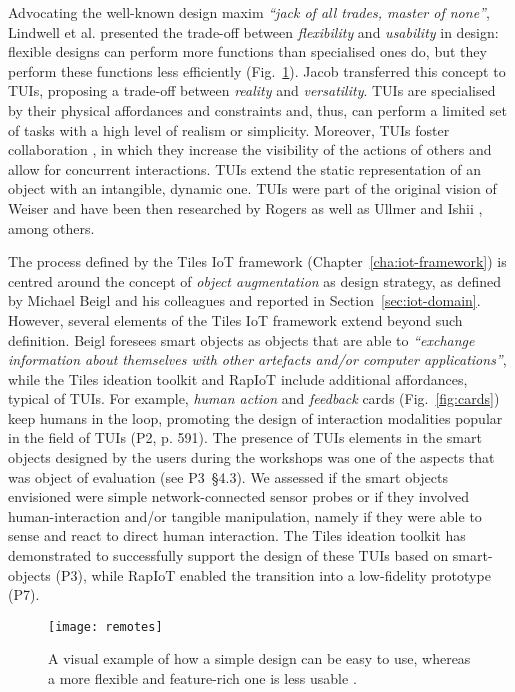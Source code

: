 Advocating the well-known design maxim \textit{\enquote{jack of all trades, master of none}}, Lindwell et al. \autocite*[p. 102]{lidwell_universal_2010} presented the trade-off between \textit{flexibility} and \textit{usability} in design: flexible designs can perform more functions than specialised ones do, but they perform these functions less efficiently (Fig.~\ref{fig:remotes}). Jacob \autocite*{jacob_reality-based_2008} transferred this concept to TUIs, proposing a trade-off between \textit{reality} and \textit{versatility}. TUIs are specialised by their physical affordances and constraints and, thus, can perform a limited set of tasks with a high level of realism or simplicity. Moreover, TUIs foster collaboration \autocite{rogers_configuring_2003}, in which they increase the visibility of the actions of others and allow for concurrent interactions. TUIs extend the static representation of an object with an intangible, dynamic one. TUIs were part of the original vision of Weiser and have been then researched by Rogers as well as Ullmer and Ishii \autocite*{ullmer_emerging_2000}, among others.

The process defined by the Tiles IoT framework (Chapter~\ref{cha:iot-framework}) is centred around the concept of \textit{object augmentation} as design strategy, as defined by Michael Beigl and his colleagues \autocite*{beigl_mediacups_2001} and reported in Section~\ref{sec:iot-domain}. However, several elements of the Tiles IoT framework extend beyond such definition. Beigl foresees smart objects as objects that are able to \textit{\enquote{exchange information about themselves with other artefacts and/or computer applications}}, while the Tiles ideation toolkit and RapIoT include additional affordances, typical of TUIs. For example, \textit{human action} and \textit{feedback} cards (Fig.~\ref{fig:cards}) keep humans in the loop, promoting the design of interaction modalities popular in the field of TUIs (P2, p. 591). The presence of TUIs elements in the smart objects designed by the users during the workshops was one of the aspects that was object of evaluation (see P3~\S4.3). We assessed if the smart objects envisioned were simple network-connected sensor probes or if they involved human-interaction and/or tangible manipulation, namely if they were able to sense and react to direct human interaction. The Tiles ideation toolkit has demonstrated to successfully support the design of these TUIs based on smart-objects (P3), while RapIoT enabled the transition into a low-fidelity prototype (P7).

\begin{figure}[hbt]
    \centering 
	\texttt{[image: remotes]}
	\caption{A visual example of how a simple design can be easy to use, whereas a more flexible and feature-rich one is less usable \autocite[p. 103]{lidwell_universal_2010}.}
	\label{fig:remotes}
\end{figure}
